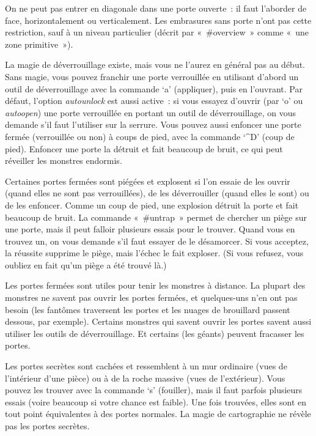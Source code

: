 \documentclass[titlepage]{article}
\begin{document}
On ne peut pas entrer en diagonale dans une porte ouverte~: il faut
l'aborder de face, horizontalement ou verticalement.
Les embrasures sans porte n'ont pas cette restriction, sauf à un niveau
particulier
(décrit par «~\#overview~» comme «~une zone primitive~»).


La magie de déverrouillage existe, mais vous ne l'aurez en général pas au
début.
Sans magie, vous pouvez franchir une porte verrouillée en utilisant
d'abord un outil de déverrouillage avec la commande `a' (appliquer),
puis en l'ouvrant.
Par défaut, l'option
\textit{autounlock}
est aussi active~: si vous essayez d'ouvrir (par `o' ou
\textit{autoopen})
une porte verrouillée en portant un outil de déverrouillage, on vous
demande s'il faut l'utiliser sur la serrure.
Vous pouvez aussi enfoncer une porte fermée (verrouillée ou non) à coups de
pied, avec la commande `\textasciicircum{}D' (coup de pied).
Enfoncer une porte la détruit et fait beaucoup de bruit, ce qui peut
réveiller les monstres endormis.


Certaines portes fermées sont piégées et explosent si l'on essaie de les
ouvrir (quand elles ne sont pas verrouillées), de les déverrouiller (quand
elles le sont) ou de les enfoncer.
Comme un coup de pied, une explosion détruit la porte et fait beaucoup de
bruit.
La commande «~\#untrap~» permet de chercher un piège sur une porte,
mais il peut falloir plusieurs essais pour le trouver.
Quand vous en trouvez un, on vous demande s'il faut essayer de le
désamorcer.
Si vous acceptez, la réussite supprime le piège, mais l'échec le fait
exploser.
(Si vous refusez, vous oubliez en fait qu'un piège a été trouvé là.)


Les portes fermées sont utiles pour tenir les monstres à distance.
La plupart des monstres ne savent pas ouvrir les portes fermées, et
quelques-uns n'en ont pas besoin (les fantômes traversent les portes et
les nuages de brouillard passent dessous, par exemple).
Certains monstres qui savent ouvrir les portes savent aussi utiliser les
outils de déverrouillage.
Et certains (les géants) peuvent fracasser les portes.


Les portes secrètes sont cachées et ressemblent à un mur ordinaire (vues
de l'intérieur d'une pièce) ou à de la roche massive (vues de
l'extérieur).
Vous pouvez les trouver avec la commande `s' (fouiller), mais il
faut parfois plusieurs essais (voire beaucoup si votre chance est faible).
Une fois trouvées, elles sont en tout point équivalentes à des portes
normales.
La magie de cartographie ne révèle pas les portes secrètes.
\end{document}
